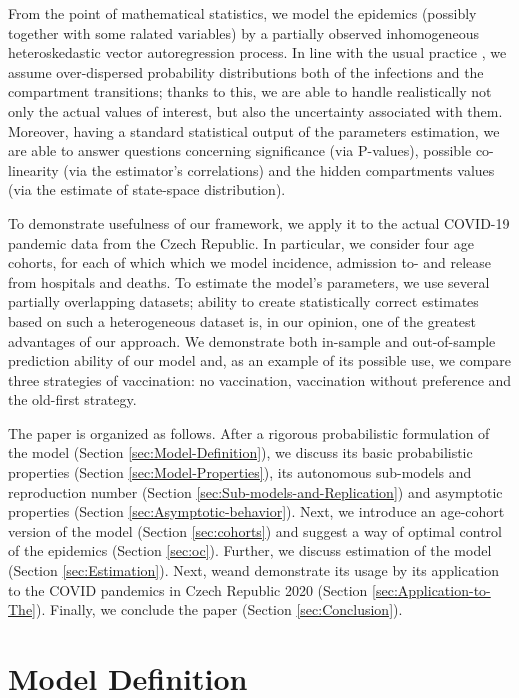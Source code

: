 \documentclass[english]{elsarticle}
\theoremstyle{plain}
\theoremstyle{remark}
\theoremstyle{plain}
\theoremstyle{definition}
\begin{document}
From the point of mathematical statistics, we model the epidemics (possibly together with some ralated variables) by a partially observed inhomogeneous heteroskedastic vector autoregression process. In line with the usual practice \cite{getz2006modeling}, we assume over-dispersed probability distributions both of the infections and the compartment transitions; thanks to this, we are able to handle realistically not only the actual values of interest, but also the uncertainty associated with them. Moreover, having a standard statistical output of the parameters estimation, we are able to answer questions concerning significance (via P-values), possible co-linearity (via the estimator's correlations) and the hidden compartments values (via the estimate of state-space distribution).

To demonstrate usefulness of our framework, we apply it to the actual COVID-19 pandemic data from the Czech Republic. In particular, we consider four age cohorts, for each of which which we model incidence, admission to- and release from hospitals and deaths. To estimate the model's parameters, we use several partially overlapping datasets; ability to create statistically correct estimates based on such a heterogeneous dataset is, in our opinion, one of the greatest advantages of our approach. We demonstrate both in-sample and out-of-sample prediction ability of our model and, as an example of its possible use, we compare three strategies of vaccination: no vaccination, vaccination without preference and the old-first strategy. 

The paper is organized as follows. After a rigorous probabilistic formulation of the model (Section \ref{sec:Model-Definition}),
we discuss its basic probabilistic properties (Section \ref{sec:Model-Properties}),
its autonomous sub-models and reproduction number (Section \ref{sec:Sub-models-and-Replication})
and asymptotic properties (Section \ref{sec:Asymptotic-behavior}).
Next, we introduce an age-cohort version of the model (Section \ref{sec:cohorts})
and suggest a way of optimal control of the epidemics (Section \ref{sec:oc}).
Further, we discuss estimation of the model (Section \ref{sec:Estimation}).
Next, weand demonstrate its usage by its application to the COVID
pandemics in Czech Republic 2020 (Section \ref{sec:Application-to-The}). Finally, we conclude the paper (Section \ref{sec:Conclusion}).







\section{Model Definition}
\end{document}
